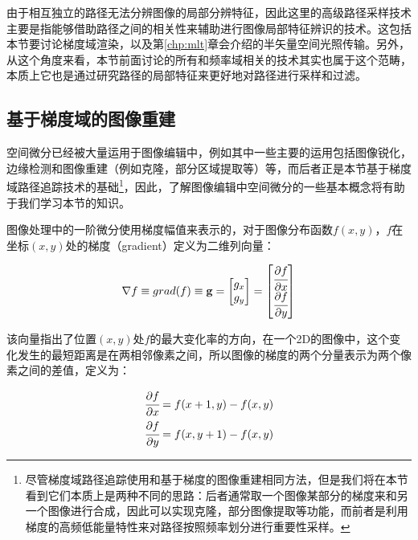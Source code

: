 由于相互独立的路径无法分辨图像的局部分辨特征，因此这里的高级路径采样技术主要是指能够借助路径之间的相关性来辅助进行图像局部特征辨识的技术。这包括本节要讨论梯度域渲染，以及第\ref{chp:mlt}章会介绍的半矢量空间光照传输。另外，从这个角度来看，本节前面讨论的所有和频率域相关的技术其实也属于这个范畴，本质上它也是通过研究路径的局部特征来更好地对路径进行采样和过滤。




	
\subsection{基于梯度域的图像重建}
空间微分已经被大量运用于图像编辑中，例如其中一些主要的运用包括图像锐化，边缘检测和图像重建（例如克隆，部分区域提取等）等，而后者正是本节基于梯度域路径追踪技术的基础\footnote{尽管梯度域路径追踪使用和基于梯度的图像重建相同方法，但是我们将在本节看到它们本质上是两种不同的思路：后者通常取一个图像某部分的梯度来和另一个图像进行合成，因此可以实现克隆，部分图像提取等功能，而前者是利用梯度的高频低能量特性来对路径按照频率划分进行重要性采样。}，因此，了解图像编辑中空间微分的一些基本概念将有助于我们学习本节的知识。

图像处理中的一阶微分使用梯度幅值来表示的，对于图像分布函数$f(x,y)$，$f$在坐标$(x,y)$处的梯度（gradient）定义为二维列向量：

\begin{equation}
	\nabla f\equiv grad(f)\equiv\mathbf{g}=\begin{bmatrix}
		g_x\\ g_y
	\end{bmatrix}=\begin{bmatrix}
		 \cfrac{{\rm \partial} f}{{\rm \partial} x} \\
		 \cfrac{{\rm \partial} f}{{\rm \partial} y}
	\end{bmatrix}
\end{equation}

\noindent 该向量指出了位置$(x,y)$处$f$的最大变化率的方向，在一个2D的图像中，这个变化发生的最短距离是在两相邻像素之间，所以图像的梯度的两个分量表示为两个像素之间的差值，定义为：

\begin{equation}
	\begin{aligned}
		 \cfrac{{\rm \partial} f}{{\rm \partial} x} &=f(x+1,y)-f(x,y)\\
		 \cfrac{{\rm \partial} f}{{\rm \partial} y} &=f(x,y+1)-f(x,y)
	\end{aligned}
\end{equation}

